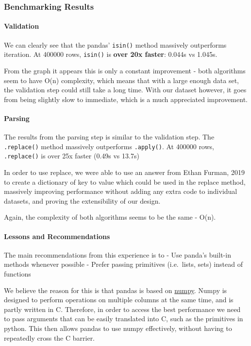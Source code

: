 \documentclass[11pt]{article}
\begin{document}
    \subsubsection{\texorpdfstring{\textbf{Benchmarking
Results}}{Benchmarking Results}}\label{benchmarking-results}

\paragraph{Validation}\label{validation}

We can clearly see that the pandas' \texttt{isin()} method massively
outperforms iteration. At 400000 rows, \texttt{isin()} is \textbf{over
20x faster}: 0.044s vs 1.045s.

From the graph it appears this is only a constant improvement - both
algorithms seem to have O(n) complexity, which means that with a large
enough data set, the validation step could still take a long time. With
our dataset however, it goes from being slightly slow to immediate,
which is a much appreciated improvement.

\paragraph{Parsing}\label{parsing}

The results from the parsing step is similar to the validation step. The
\texttt{.replace()} method massively outperforms \texttt{.apply()}. At
400000 rows, \texttt{.replace()} is over 25x faster (0.49s vs 13.7s)

In order to use replace, we were able to use an answer from Ethan
Furman, 2019 to create a dictionary of key to value which could be used
in the replace method, massively improving performance without adding
any extra code to individual datasets, and proving the extensibility of
our design.

Again, the complexity of both algorithms seems to be the same - O(n).

\paragraph{Lessons and
Recommendations}\label{lessons-and-recommendations}

The main recommendations from this experience is to - Use panda's
built-in methods whenever possible - Prefer passing primitives
(i.e.~lists, sets) instead of functions

We believe the reason for this is that pandas is based on
\href{https://numpy.org/}{numpy}. Numpy is designed to perform
operations on multiple columns at the same time, and is partly written
in C. Therefore, in order to access the best performance we need to pass
arguments that can be easily translated into C, such as the primitives
in python. This then allows pandas to use numpy effectively, without
having to repeatedly cross the C barrier.
\end{document}
